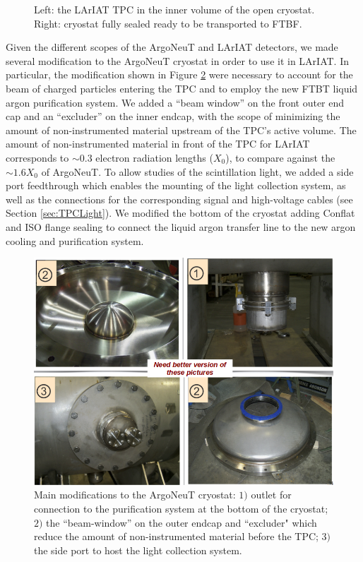 \begin{figure}[htb]
\caption{ Left: the LArIAT TPC in the inner volume of the open cryostat. Right: cryostat fully sealed ready to be transported to FTBF. }
\label{fig:LArIATCryoStat}
\end{figure}

Given the different scopes of the ArgoNeuT and LArIAT detectors, we made several modification to the ArgoNeuT cryostat in order to use it in LArIAT. In particular, the modification  shown in Figure \ref{fig:LArIATCryoMods} were necessary to account for the beam of charged particles entering the TPC and to employ the new FTBT liquid argon purification system. 
We added a ``beam window'' on the front outer end cap and an ``excluder'' on the inner endcap, with the scope of minimizing the amount of non-instrumented material upstream of the TPC's active volume. The amount of non-instrumented material in front of the TPC for LArIAT corresponds to $\sim$0.3 electron radiation lengths ($X_{0}$), to compare against the  $\sim 1.6 X_{0}$ of ArgoNeuT. To allow studies of the scintillation light, we added a side port feedthrough which enables the mounting of the light collection system, as well as the connections for the corresponding signal and high-voltage cables (see Section \ref{sec:TPCLight}).  We modified the bottom of the cryostat adding Conflat and ISO flange sealing to connect the liquid argon transfer line to the new argon cooling and purification system.


\begin{figure}[htb]
\centering
\includegraphics[scale=0.35]{Chapter-3/Images/CryoMods.png}
\caption{Main modifications to the ArgoNeuT cryostat: $1)$ outlet for connection to the purification system at the bottom of the cryostat; $2)$ the ``beam-window'' on the outer endcap and ``excluder"  which reduce the amount of non-instrumented material before the TPC; $3)$ the side port to host  the  light collection system.}
\label{fig:LArIATCryoMods}
\end{figure}

